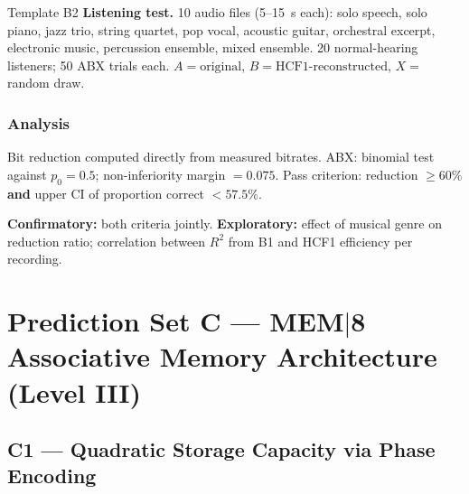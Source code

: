 \documentclass[11pt, a4paper]{article}
\newcommand{\mem}{MEM$|$8}
\newcommand{\hcf}{HCF1}
\begin{document}
\begin{predbox}{Template B2}
\textbf{Listening test.}
10 audio files (5–15~s each): solo speech, solo piano, jazz trio, string quartet,
pop vocal, acoustic guitar, orchestral excerpt, electronic music, percussion
ensemble, mixed ensemble.  20 normal-hearing listeners; 50 ABX trials each.
$A = \text{original}$, $B = \text{\hcf{}-reconstructed}$, $X = $ random draw.

\subsubsection{Analysis}

Bit reduction computed directly from measured bitrates.  ABX: binomial test
against $p_0 = 0.5$; non-inferiority margin $= 0.075$.  Pass criterion: reduction
$\geq 60\%$ \textbf{and} upper CI of proportion correct $< 57.5\%$.

\textbf{Confirmatory:} both criteria jointly.
\textbf{Exploratory:} effect of musical genre on reduction ratio; correlation
between $R^2$ from B1 and \hcf{} efficiency per recording.

\end{predbox}

\section{Prediction Set C — \mem{} Associative Memory Architecture (Level III)}

\subsection{C1 — Quadratic Storage Capacity via Phase Encoding}
\end{document}
